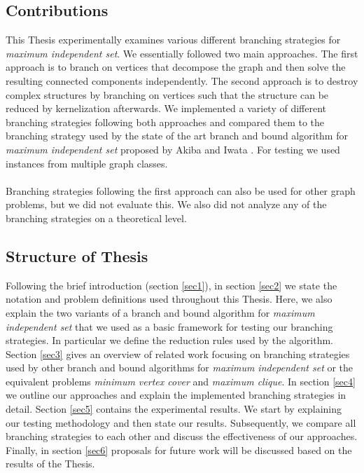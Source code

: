\documentclass[]{article}
\begin{document}
\subsection{Contributions}

This Thesis experimentally examines various different branching strategies for \textit{maximum independent set}. We essentially followed two main approaches. The first approach is to branch on vertices that decompose the graph and then solve the resulting connected components independently. The second approach is to destroy complex structures by branching on vertices such that the structure can be reduced by kernelization afterwards. We implemented a variety of different branching strategies following both approaches and compared them to the branching strategy used by the state of the art branch and bound algorithm for \textit{maximum independent set} proposed by Akiba and Iwata \cite{akiba_iwata}. For testing we used instances from multiple graph classes.\\\\
Branching strategies following the first approach can also be used for other graph problems, but we did not evaluate this. We also did not analyze any of the branching strategies on a theoretical level.  



\subsection{Structure of Thesis}

Following the brief introduction (section \ref{sec1}), in section \ref{sec2} we state the notation and problem definitions used throughout this Thesis. Here, we also explain the two variants of a branch and bound algorithm for \textit{maximum independent set} that we used as a basic framework for testing our branching strategies. In particular we define the reduction rules used by the algorithm.\\
Section \ref{sec3} gives an overview of related work focusing on branching strategies used by other branch and bound algorithms for \textit{maximum independent set} or the equivalent problems \textit{minimum vertex cover} and \textit{maximum clique}.
In section \ref{sec4} we outline our approaches and explain the implemented branching strategies in detail. Section \ref{sec5} contains the experimental results. We start by explaining our testing methodology and then state our results. Subsequently, we compare all branching strategies to each other and discuss the effectiveness of our approaches. Finally, in section \ref{sec6} proposals for future work will be discussed based on the results of the Thesis.
\end{document}
